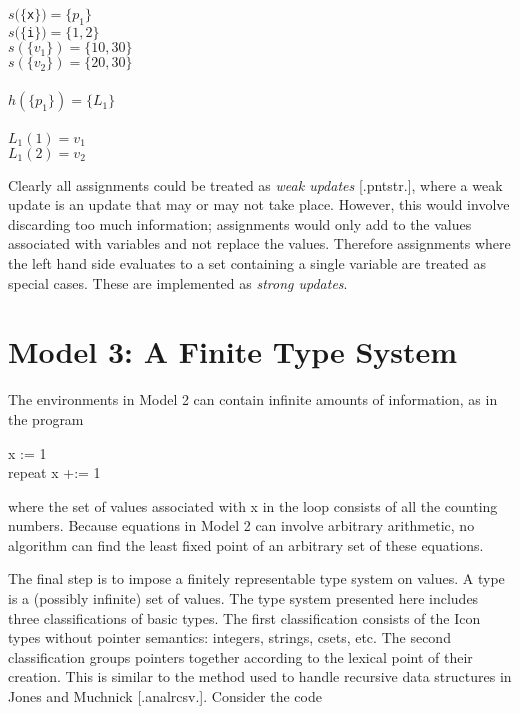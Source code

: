 \goodbreak
\begin{specialcode}{}
\>$s(\{$\texttt{x}$\}) = \{ p_1 \}$\\
\>$s(\{$\texttt{i}$\}) = \{1, 2\}$\\
\>$s(\{v_1\}) = \{10, 30\}$\\
\>$s(\{v_2\}) = \{20, 30\}$\\
\\
\>$h(\{p_1\}) = \{L_1\}$\\
\\
\>$L_1(1) = v_1$\\
\>$L_1(2) = v_2$\\
\end{specialcode}


Clearly all assignments could be treated as \textit{weak updates}
[.pntstr.], where a weak update is an update that may or may not take
place. However, this would involve discarding too much information;
assignments would only add to the values associated with variables and
not replace the values. Therefore assignments where the left hand side
evaluates to a set containing a single variable are treated as special
cases. These are implemented as \textit{strong updates}.

\section*{Model 3: A Finite Type System}

The environments in Model 2 can contain infinite amounts of
information, as in the program

\goodbreak
\begin{iconcode}
\>x := 1\\
\>repeat x +:= 1\\
\end{iconcode}

\noindent where the set of values associated with x in the loop
consists of all the counting numbers. Because equations in Model 2 can
involve arbitrary arithmetic, no algorithm can find the least fixed
point of an arbitrary set of these equations.

The final step is to impose a finitely representable type system on
values. A type is a (possibly infinite) set of values. The type system
presented here includes three classifications of basic types. The
first classification consists of the Icon types without pointer
semantics: integers, strings, csets, etc. The second classification
groups pointers together according to the lexical point of their
creation. This is similar to the method used to handle recursive data
structures in Jones and Muchnick [.analrcsv.]. Consider the code

